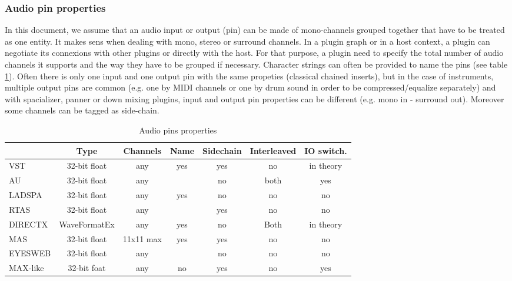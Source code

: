 \subsubsection{Audio pin properties}
\noindent In this document, we assume that an audio input or output (pin) can be made of mono-channels grouped together that have to be treated as one entity. It makes sens when dealing with mono, stereo or surround channels. In a plugin graph or in a host context, a plugin can negotiate its connexions with other plugins or directly with the host. For that purpose, a plugin need to specify the total number of audio channels it supports and the way they have to be grouped if necessary. Character strings can often be provided to name the pins (see table \ref{pin}). Often there is only one input and one output pin with the same propeties (classical chained inserts), but in the case of instruments, multiple output pins are common (e.g. one by MIDI channels or one by drum sound in order to be compressed/equalize separately) and with spacializer, panner or down mixing plugins, input and output pin properties can be different (e.g. mono in - surround out). Moreover some channels can be tagged as side-chain.\\

\begin{table}[htb]
{
\footnotesize
\begin{tabular}{|l|c|c|c|c|c|c|}
\hline
        & Type       & Channels & Name & Sidechain & Interleaved & IO switch.\\
\hline
VST     &32-bit float& any      &  yes &    yes    &    no       & in theory\\
\hline
AU      &32-bit float& any      &      &     no    &    both     & yes\\
\hline
LADSPA  &32-bit float& any      &  yes &     no    &    no       & no\\
\hline
RTAS    &32-bit float& any      &      &    yes    &    no       & no\\
\hline
DIRECTX &WaveFormatEx& any      &  yes &     no    &    Both     & in theory\\
\hline
MAS     &32-bit float& 11x11 max&  yes &    yes    &    no       & no\\
\hline
EYESWEB &32-bit float& any      &      &     no    &    no       & no\\
\hline
MAX-like&32-bit foat & any      &   no &    yes    &    no       & yes\\
\hline
\end{tabular}
}
\caption{Audio pins properties}
\label{pin}
\end{table}

